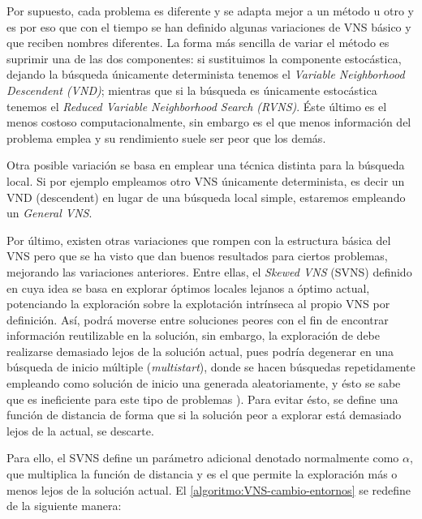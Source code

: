 Por supuesto, cada problema es diferente y se adapta mejor a un método u otro y es por eso que con el tiempo se han definido algunas variaciones de VNS básico y que reciben nombres diferentes. La forma más sencilla de variar el método es suprimir una de las dos componentes: si sustituimos la componente estocástica, dejando la búsqueda únicamente determinista tenemos el \textit{Variable Neighborhood Descendent (VND)}; mientras que si la búsqueda es únicamente estocástica tenemos el \textit{Reduced Variable Neighborhood Search (RVNS)}. Éste último es el menos costoso computacionalmente, sin embargo es el que menos información del problema emplea y su rendimiento suele ser peor que los demás. 

Otra posible variación se basa en  emplear una técnica distinta para la búsqueda local. Si por ejemplo empleamos otro VNS únicamente determinista, es decir un VND (descendent) en lugar de una búsqueda local simple, estaremos empleando un \textit{General VNS}.

Por último, existen otras variaciones que rompen con la estructura básica del VNS pero que se ha visto que dan buenos resultados para ciertos problemas,  mejorando las variaciones anteriores. Entre ellas, el \textit{Skewed VNS} (SVNS) definido en \cite{svns-def} cuya idea se basa en explorar óptimos locales lejanos a óptimo actual, potenciando la exploración sobre la explotación intrínseca al propio VNS por definición. Así, podrá moverse entre soluciones peores con el fin de encontrar información reutilizable en la solución, sin embargo, la exploración de debe realizarse demasiado lejos de la solución actual, pues podría degenerar en una búsqueda de inicio múltiple (\textit{multistart}), donde se hacen búsquedas repetidamente empleando como solución de inicio una generada aleatoriamente, y ésto se sabe que es ineficiente para este tipo de problemas \cite{vns}). Para evitar ésto, se define una función de distancia de forma que si la solución peor a explorar está demasiado lejos de la actual, se descarte.

Para ello, el SVNS define un parámetro adicional denotado normalmente como $\alpha$, que multiplica la función de distancia y es el que permite la exploración más o menos lejos de la solución actual. El \autoref{algoritmo:VNS-cambio-entornos} se redefine de la siguiente manera:


